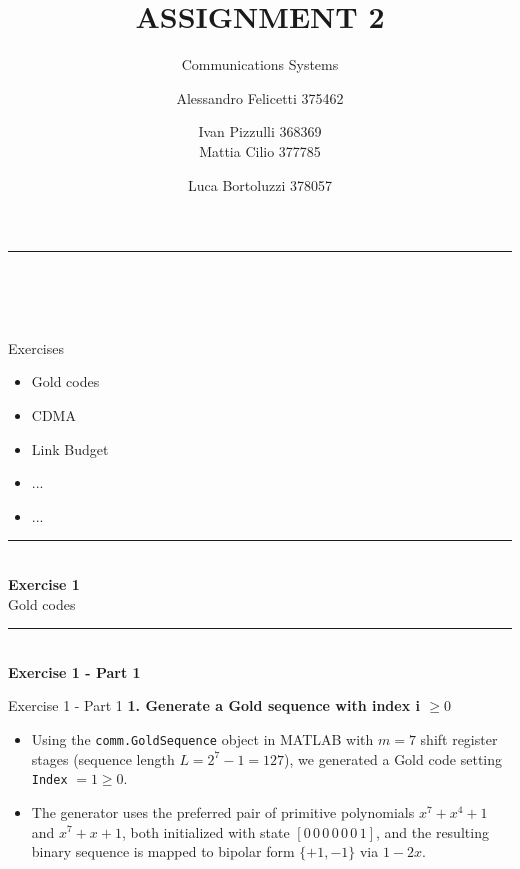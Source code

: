 \documentclass[10pt, aspectratio=169]{beamer}
\title{ASSIGNMENT 2}
\subtitle{Communications Systems}
\author{Alessandro Felicetti 375462 \and Ivan Pizzulli 368369 \\ Mattia Cilio 377785 \and Luca Bortoluzzi 378057}
\date{}
\newcommand{\question}[1]{{\color{QuestionRed}\textbf{#1}}}
\begin{document}
	
	\begin{frame}[plain]
		\vspace{1.0cm}
		\begin{flushleft}
			{\color{TealAccent}\rule{2.5cm}{2pt}}\\[0.5cm]
			{\inserttitle}\\[0.2cm]
			{\insertsubtitle}\\[1.0cm]
			{\insertauthor}
		\end{flushleft}
	\end{frame}
	
	\begin{frame}{Exercises}
		\begin{itemize}
			\item Gold codes
			\item CDMA
			\item Link Budget
			\item ...
			\item ...
		\end{itemize}
	\end{frame}
	
	\begin{frame}[plain]
		\vfill
		\centering
		{\color{TealAccent}\rule{2cm}{2pt}}\\[0.4cm]
		{\LARGE\bfseries\color{NavyPrimary} Exercise 1}\\[0.2cm]
		{\large\color{SlateNeutral} Gold codes}
		\vfill
	\end{frame}
	
	\begin{frame}[plain]
		\vfill
		\centering
		{\color{TealAccent}\rule{2cm}{2pt}}\\[0.4cm]
		{\LARGE\bfseries\color{NavyPrimary} Exercise 1 - Part 1}\\[0.2cm]
		\vfill
	\end{frame}
	
	\begin{frame}{Exercise 1 - Part 1}
		\question{1. Generate a Gold sequence with index i $ \geq 0$}
		
		\vspace{0.1cm}
		\begin{itemize}
			\item Using the \texttt{comm.GoldSequence} object in MATLAB with $m = 7$ shift register stages (sequence length $L = 2^7 - 1 = 127$), we generated a Gold code setting \texttt{Index} $= 1 \ge 0$.
			\item The generator uses the preferred pair of primitive polynomials $x^7 + x^4 + 1$ and $x^7 + x + 1$, both initialized with state $[0\,0\,0\,0\,0\,0\,1]$, and the resulting binary sequence is mapped to bipolar form $\{+1, -1\}$ via $1 - 2x$.
		\end{itemize}
		
	\end{frame}
	
\end{document}
